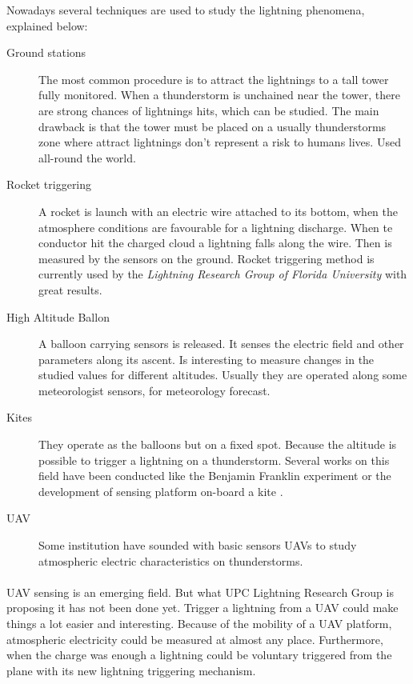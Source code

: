  \noindent Nowadays several techniques are used to study the lightning phenomena, explained below:
 \begin{description}
 	\item[Ground stations] The most common procedure is to attract the lightnings to a tall tower fully monitored. When a thunderstorm is unchained near the tower, there are strong chances of lightnings hits, which can be studied. The main drawback is that the tower must be placed on a usually thunderstorms zone where attract lightnings don't represent a risk to humans lives. Used all-round the world.  
 	\item[Rocket triggering] A rocket is launch with an electric wire attached to its bottom, when the atmosphere conditions are favourable for a lightning discharge. When te conductor hit the  charged cloud a lightning falls along the wire. Then is measured by the sensors on the ground. Rocket triggering method is currently used by the \textit{Lightning Research Group of Florida University} with great results.
 	\item[High Altitude Ballon] A balloon carrying sensors is released. It senses the electric field and other parameters along its ascent. Is interesting to measure changes in the studied values for different altitudes. Usually they are operated along some meteorologist sensors, for meteorology forecast.
 	\item[Kites] They operate as the balloons but on a fixed spot. Because the altitude is possible to trigger a lightning on a thunderstorm. Several works on this field have been conducted like the Benjamin Franklin experiment or the development of sensing platform on-board a kite \cite{tfgsensing}.
 	\item[UAV] Some institution have sounded with basic sensors UAVs to study atmospheric electric characteristics on thunderstorms. 
 \end{description}

\paragraph{}UAV sensing is an emerging field. But what UPC Lightning Research Group is proposing it has not been done yet. Trigger a lightning from a UAV could make things a lot easier and interesting. Because of the mobility of a UAV platform, atmospheric electricity could be measured at almost any place. Furthermore, when the charge was enough a lightning could be voluntary triggered from the plane with its new lightning triggering mechanism.

